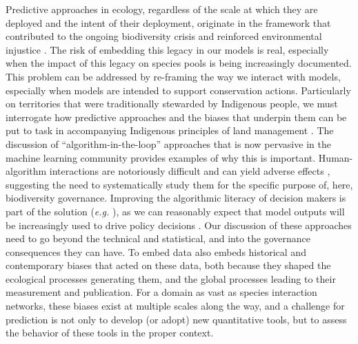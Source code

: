 Predictive approaches in ecology, regardless of the scale at which they
are deployed and the intent of their deployment, originate in the
framework that contributed to the ongoing biodiversity crisis
\cite{Adam2014Elephant} and reinforced environmental injustice
\cite{Choudry2013Saving, Dominguez2020Decolonising}. The risk of
embedding this legacy in our models is real, especially when the impact
of this legacy on species pools is being increasingly documented. This
problem can be addressed by re-framing the way we interact with models,
especially when models are intended to support conservation actions.
Particularly on territories that were traditionally stewarded by
Indigenous people, we must interrogate how predictive approaches and the
biases that underpin them can be put to task in accompanying Indigenous
principles of land management \cite{Eichhorn2019Steps,
Nokmaq2021Awakening}. The discussion of ``algorithm-in-the-loop''
approaches that is now pervasive in the machine learning community
provides examples of why this is important. Human-algorithm interactions
are notoriously difficult and can yield adverse effects
\cite{Green2019Disparate, Stevenson2021Algorithmic}, suggesting the
need to systematically study them for the specific purpose of, here,
biodiversity governance. Improving the algorithmic literacy of decision
makers is part of the solution (\emph{e.g.} \cite{Lamba2019Deep, 
MoseboFernandes2020Machine}), as we can reasonably expect that model
outputs will be increasingly used to drive policy decisions
\cite{Weiskopf2022Increasing}. Our discussion of these approaches need
to go beyond the technical and statistical, and into the governance
consequences they can have. To embed data also embeds historical and
contemporary biases that acted on these data, both because they shaped
the ecological processes generating them, and the global processes
leading to their measurement and publication. For a domain as vast as
species interaction networks, these biases exist at multiple scales
along the way, and a challenge for prediction is not only to develop (or
adopt) new quantitative tools, but to assess the behavior of these tools
in the proper context.

